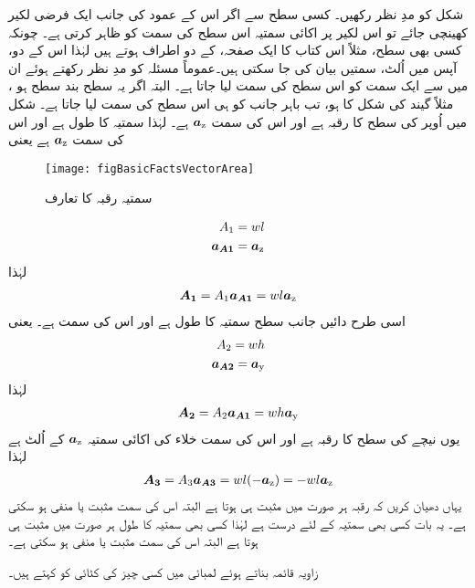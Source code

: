 شکل  کو مدِ نظر رکھیں۔ کسی سطح سے اگر اس کے عمود کی جانب ایک فرضی لکیر کھینچی جائے تو اس  لکیر پر اکائی سمتیہ اس سطح کی سمت کو ظاہر کرتی ہے۔ چونکہ کسی بھی سطح، مثلاً اس کتاب کا ایک صفحہ،  کے دو اطراف ہوتے ہیں لہٰذا اس کے دو،  آپس میں اُلٹ،  سمتیں بیان کی جا سکتی ہیں۔عموماً مسئلہ کو مدِ نظر رکھتے ہوئے  ان میں سے ایک سمت کو اس سطح کی سمت  لیا جاتا ہے۔ البتہ اگر یہ سطح بند سطح ہو ، مثلاً  گیند کی شکل کا ہو،  تب باہر جانب کو ہی اس سطح کی سمت لیا جاتا ہے۔ شکل میں اُوپر کی سطح   کا رقبہ  ہے اور اس کی سمت ${\boldsymbol{a}}_{\textup{z}}$ ہے۔ لہٰذا   سمتیہ کا طول   ہے اور اس کی سمت ${\boldsymbol{a}}_{\textup{z}}$ ہے یعنی
\begin{figure}
\centering
\texttt{[image: figBasicFactsVectorArea]}
\caption{سمتیہ رقبہ کا تعارف‬}
\label{شکل_حقائق_رقبہ_سمتیہ}
\end{figure}
%
\begin{align*}
A_1&=wl\\
{{\boldsymbol{a_{A1}}}}&={\boldsymbol{a}}_{\textup{z}}
\end{align*}
لہٰذا
\begin{align}
{\ensuremath{{\boldsymbol{A_1}}}}=A_1 {{\boldsymbol{a_{A1}}}}= w l {\boldsymbol{a}}_{\textup{z}}
\end{align}
اسی طرح دائیں جانب سطح  سمتیہ  کا طول  ہے اور اس کی سمت  ہے۔ یعنی
\begin{align*}
A_2=wh\\
{{\boldsymbol{a_{A2}}}}={\boldsymbol{a}}_{\textup{y}}
\end{align*}
لہٰذا
\begin{align}
{\ensuremath{{\boldsymbol{A_2}}}}=A_2 {{\boldsymbol{a_{A1}}}}=w h {\boldsymbol{a}}_{\textup{y}}
\end{align}
یوں نیچے کی سطح کا رقبہ  ہے اور اس کی سمت خلاء کی  اکائی سمتیہ ${\boldsymbol{a}}_{\textup{z}}$ کے اُلٹ ہے لہٰذا
\begin{align}
{\ensuremath{{\boldsymbol{A_3}}}}=A_3 {{\boldsymbol{a_{A3}}}}=wl (-{\boldsymbol{a}}_{\textup{z}})=-wl {\boldsymbol{a}}_{\textup{z}}
\end{align}
یہاں دھیان کریں کہ رقبہ ہر صورت میں مثبت ہی ہوتا ہے البتہ اس کی سمت مثبت یا منفی ہو سکتی ہے۔ یہ بات کسی بھی سمتیہ کے لئے درست ہے لہٰذا کسی بھی سمتیہ کا طول ہر صورت میں مثبت ہی ہوتا ہے البتہ اس کی سمت مثبت یا منفی ہو سکتی ہے۔

زاویہ قائمہ بناتے ہوئے لمبائی میں کسی چیز کی کٹائی کو  کہتے ہیں۔	

